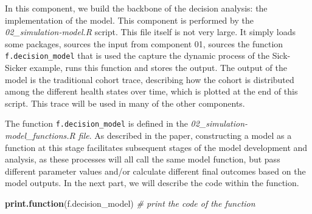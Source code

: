 \documentclass[]{article}
\newenvironment{Shaded}{\begin{snugshade}}{\end{snugshade}}
\newcommand{\KeywordTok}[1]{\textcolor[rgb]{0.13,0.29,0.53}{\textbf{#1}}}
\newcommand{\CommentTok}[1]{\textcolor[rgb]{0.56,0.35,0.01}{\textit{#1}}}
\newcommand{\NormalTok}[1]{#1}
\begin{document}
In this component, we build the backbone of the decision analysis: the
implementation of the model. This component is performed by the
\emph{02\_simulation-model.R} script. This file itself is not very
large. It simply loads some packages, sources the input from component
01, sources the function \texttt{f.decision\_model} that is used the
capture the dynamic process of the Sick-Sicker example, runs this
function and stores the output. The output of the model is the
traditional cohort trace, describing how the cohort is distributed among
the different health states over time, which is plotted at the end of
this script. This trace will be used in many of the other components.

The function \texttt{f.decision\_model} is defined in the
\emph{02\_simulation-model\_functions.R file}. As described in the
paper, constructing a model as a function at this stage facilitates
subsequent stages of the model development and analysis, as these
processes will all call the same model function, but pass different
parameter values and/or calculate different final outcomes based on the
model outputs. In the next part, we will describe the code within the
function.

\begin{Shaded}
\begin{Highlighting}[]
\KeywordTok{print.function}\NormalTok{(f.decision_model) }\CommentTok{# print the code of the function}
\end{Highlighting}
\end{Shaded}
\end{document}
